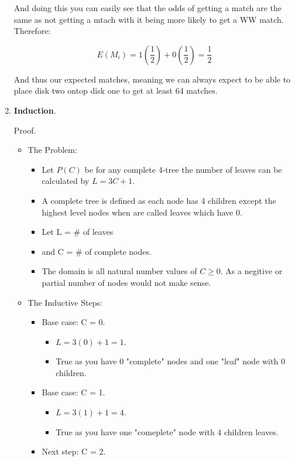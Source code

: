\documentclass{article}
\begin{document}
\begin{enumerate}
    And doing this you can easily see that the odds of getting a match are the same as not getting a mtach with it being more likely to get a WW match. Therefore:

    \[E(M_i) = 1(\frac{1}{2}) + 0(\frac{1}{2}) = \frac{1}{2}\]

    And thus our expected matches,  meaning we can always expect to be able to place disk two ontop disk one to get at least 64 matches.

    \item \textbf{Induction}.
    
    Proof.
    
    \begin{itemize}
      \item The Problem:
      \begin{itemize}
        \item Let $P(C)$ be for any complete 4-tree the number of leaves can be calculated by $L = 3C + 1$.
        \item A complete tree is defined as each node has 4 children except the highest level nodes when are called leaves which have 0. 
        \item Let L = \# of leaves
        \item and C = \# of complete nodes.
        \item The domain is all natural number values of $C \geq 0$. As a negitive or partial number of nodes would not make sense.
      \end{itemize}
      \item The Inductive Steps:
      \begin{itemize}
        \item Base case: C = 0.
        \begin{itemize}
          \item $L = 3(0) + 1 = 1$. 
          \item True as you have 0 "complete" nodes and one "leaf" node with 0 children.          
        \end{itemize}
        \item Base case: C = 1.
        \begin{itemize}
          \item $L = 3(1) + 1 = 4$. 
          \item True as you have one "comeplete" node with 4 children leaves.          
        \end{itemize}
        \item Next step: C = 2.

\end{itemize}
\end{itemize}
\end{enumerate}
\end{document}
